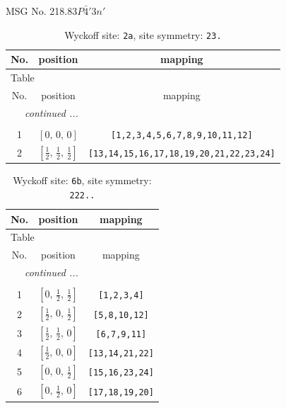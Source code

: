 \documentclass[fleqn,8pt]{jsarticle}
\begin{document}
\setcounter{MaxMatrixCols}{32}

\renewcommand{\tablename}{Table~}
\renewcommand{\figurename}{Figure~}
\begin{center}
\LARGE
MSG No. 218.83\quad$P\bar{4}'3n'$
\end{center}
\renewcommand{\arraystretch}{1.2}
\begin{longtable}{ccc}
\caption{Wyckoff site: {\tt 2a}, site symmetry: {\tt 23.}}
 \\
 \hline \hline
No. & position & mapping \\ \hline \endfirsthead

\multicolumn{2}{l}{\tablename\ \thetable{}} \\
 \hline \hline
No. & position & mapping \\ \hline \endhead

 \hline \hline
\multicolumn{2}{r}{\footnotesize\it continued ...} \\ \endfoot

 \hline \hline
\multicolumn{2}{r}{} \\ \endlastfoot

1 & $\left[ 0,\, 0,\, 0 \right]$ & {\tt [1,2,3,4,5,6,7,8,9,10,11,12]} \\ \hline
2 & $\left[ \frac{1}{2},\, \frac{1}{2},\, \frac{1}{2} \right]$ & {\tt [13,14,15,16,17,18,19,20,21,22,23,24]} \\
\end{longtable}
\renewcommand{\arraystretch}{1.2}
\begin{longtable}{ccc}
\caption{Wyckoff site: {\tt 6b}, site symmetry: {\tt 222..}}
 \\
 \hline \hline
No. & position & mapping \\ \hline \endfirsthead

\multicolumn{2}{l}{\tablename\ \thetable{}} \\
 \hline \hline
No. & position & mapping \\ \hline \endhead

 \hline \hline
\multicolumn{2}{r}{\footnotesize\it continued ...} \\ \endfoot

 \hline \hline
\multicolumn{2}{r}{} \\ \endlastfoot

1 & $\left[ 0,\, \frac{1}{2},\, \frac{1}{2} \right]$ & {\tt [1,2,3,4]} \\ \hline
2 & $\left[ \frac{1}{2},\, 0,\, \frac{1}{2} \right]$ & {\tt [5,8,10,12]} \\ \hline
3 & $\left[ \frac{1}{2},\, \frac{1}{2},\, 0 \right]$ & {\tt [6,7,9,11]} \\ \hline
4 & $\left[ \frac{1}{2},\, 0,\, 0 \right]$ & {\tt [13,14,21,22]} \\ \hline
5 & $\left[ 0,\, 0,\, \frac{1}{2} \right]$ & {\tt [15,16,23,24]} \\ \hline
6 & $\left[ 0,\, \frac{1}{2},\, 0 \right]$ & {\tt [17,18,19,20]} \\
\end{longtable}
\end{document}
